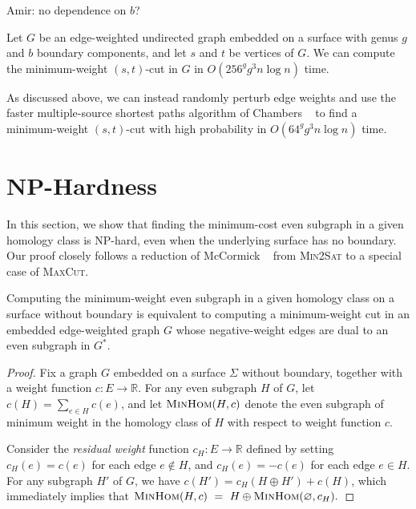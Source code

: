 \documentclass[letterpaper,review]{siamart190516}
\def\Real{\mathbb{R}}
\def\anote#1{\color{purple}Amir: #1 \color{black}}
\begin{document}
{\anote{no dependence on $b$?}
\begin{corollary}
\label{cor:mincut}
Let $G$ be an edge-weighted undirected graph embedded on a surface with genus $g$ and $b$ boundary
components, and let $s$ and $t$ be vertices of $G$.  We can compute the minimum-weight $(s,t)$-cut
in $G$ in $O(256^g g^3 n \log n)$ time.
\end{corollary}

As discussed above, we can instead randomly perturb edge weights and use the faster multiple-source
shortest paths algorithm of Chambers \etal~\cite{cce-msspe-13} to find a minimum-weight $(s,t)$-cut
with high probability in $O(64^g g^3 n \log n)$ time.

\section{{NP}-Hardness}
\label{S:NPhard}

In this section, we show that finding the minimum-cost even subgraph in a given homology class is {NP}-hard, even when the underlying surface has no boundary.  Our proof closely follows a reduction of McCormick \etal~\cite{mrr-edofm-03} from \textsc{Min2Sat} to a special case of \textsc{MaxCut}.

\begin{theorem}
Computing the minimum-weight even subgraph in a given homology class on a surface without boundary is equivalent to computing a minimum-weight cut in an embedded edge-weighted graph $G$ whose negative-weight edges are dual to an even subgraph in $G^*$.
\end{theorem}

\begin{proof}
Fix a graph $G$ embedded on a surface $\Sigma$ without boundary, together with a weight function $c\colon E\to \Real$.  For any even subgraph $H$ of $G$, let $c(H) = \sum_{e\in H} c(e)$, and let $\textsc{MinHom}(H,c)$ denote the even subgraph of minimum weight in the homology class of $H$ with respect to weight function $c$.

Consider the \emph{residual weight} function $c_H\colon E\to \Real$ defined by setting $c_H(e) = c(e)$ for each edge $e\not\in H$, and $c_H(e) = -c(e)$ for each edge $e\in H$.  For any subgraph $H'$ of $G$, we have $c(H') = c_H(H\oplus H') + c(H)$, which immediately implies that
\(
    \textsc{MinHom}(H,c) ~=~
    H \oplus \textsc{MinHom}(\varnothing, c_H).
\)



\end{proof}}
\end{document}
